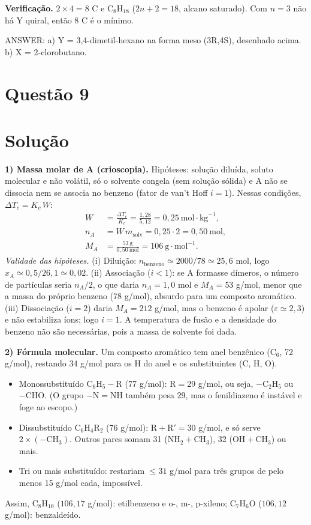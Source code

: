 \documentclass{article}%
\begin{document}
\textbf{Verificação.} $2\times4=8$ C e $\mathrm{C_8H_{18}}$ ($2n+2=18$, alcano saturado). Com $n=3$ não há Y quiral, então $8$ C é o mínimo.

ANSWER: a) Y = 3,4-dimetil-hexano na forma meso (3R,4S), desenhado acima. b) X = 2-clorobutano.%
\newpage%
\section*{Questão 9}

\section*{Solução}

\textbf{1) Massa molar de A (crioscopia).}
Hipóteses: solução diluída, soluto molecular e não volátil, só o solvente congela (sem solução sólida) e A não se dissocia nem se associa no benzeno (fator de van't Hoff $i=1$). Nessas condições, $\Delta T_c = K_c\,W$:
\begin{align*}
W&=\frac{\Delta T_c}{K_c}=\frac{1{,}28}{5{,}12}=0{,}25\ \text{mol}\cdot\text{kg}^{-1},\\
n_A&=W\,m_{\text{solv}}=0{,}25\cdot 2=0{,}50\ \text{mol},\\
M_A&=\frac{53\ \text{g}}{0{,}50\ \text{mol}}=106\ \text{g}\cdot\text{mol}^{-1}.
\end{align*}
\emph{Validade das hipóteses.} (i) Diluição: $n_{\text{benzeno}}\simeq 2000/78\simeq 25{,}6$ mol, logo $x_A\simeq 0{,}5/26{,}1\simeq 0{,}02$. (ii) Associação ($i<1$): se A formasse dímeros, o número de partículas seria $n_A/2$, o que daria $n_A=1{,}0$ mol e $M_A=53$ g/mol, menor que a massa do próprio benzeno (78 g/mol), absurdo para um composto aromático. (iii) Dissociação ($i=2$) daria $M_A=212$ g/mol, mas o benzeno é apolar ($\varepsilon\simeq 2{,}3$) e não estabiliza íons; logo $i=1$. A temperatura de fusão e a densidade do benzeno não são necessárias, pois a massa de solvente foi dada.

\textbf{2) Fórmula molecular.}
Um composto aromático tem anel benzênico ($\mathrm{C_6}$, 72 g/mol), restando $34$ g/mol para os H do anel e os substituintes (C, H, O).
\begin{itemize}
\item Monossubstituído $\mathrm{C_6H_5\!-\!R}$ (77 g/mol): $\mathrm{R}=29$ g/mol, ou seja, $-\mathrm{C_2H_5}$ ou $-\mathrm{CHO}$. (O grupo $-\mathrm{N{=}NH}$ também pesa 29, mas o fenildiazeno é instável e foge ao escopo.)
\item Dissubstituído $\mathrm{C_6H_4R_2}$ (76 g/mol): $\mathrm{R+R'}=30$ g/mol, e só serve $2\times(-\mathrm{CH_3})$. Outros pares somam 31 ($\mathrm{NH_2}+\mathrm{CH_3}$), 32 ($\mathrm{OH}+\mathrm{CH_3}$) ou mais.
\item Tri ou mais substituído: restariam $\le 31$ g/mol para três grupos de pelo menos 15 g/mol cada, impossível.
\end{itemize}
Assim, $\mathrm{C_8H_{10}}$ ($106{,}17$ g/mol): etilbenzeno e o-, m-, p-xileno; $\mathrm{C_7H_6O}$ ($106{,}12$ g/mol): benzaldeído.
\end{document}
